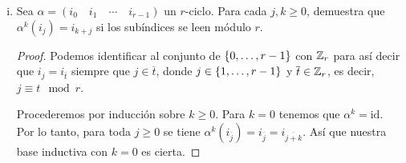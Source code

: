 \setcounter{section}{1}
\begin{enumerate}[(i)] \item
        Sea \( \alpha = \left( i_0\quad i_1\quad \cdots\quad i_{r-1} \right) \) un \( r \)-ciclo.
        Para cada \( j,k\geq 0 \), demuestra que \( \alpha^k \left( i_j \right) = i_{k+j} \) 
        si los subíndices se leen módulo \( r \).
        \begin{proof}
            Podemos identificar al conjunto de
            \( \left\{ 0,\ldots,r-1 \right\} \) con \( \mathbb{Z}_{r} \) para así decir que 
            \( i_{j}= i_{\overline{t}} \) siempre que \( j\in \overline{t} \), 
            donde \( j\in\left\{ 1,\ldots,r-1 \right\} \) y \( \overline{t}\in\mathbb{Z}_{r} \), es
            decir, \( j \equiv t \mod r  \). 

            Procederemos por inducción sobre \( k\geq 0 \). Para \( k = 0 \) 
            tenemos que \( \alpha^k = \mathrm{id} \). Por lo tanto, para toda $j\geq 0$
            se tiene \( \alpha^k \left( i_{\overline{j}} \right) = i_{\overline{j}}=
            i_{\overline{j+k}}\). Así que nuestra base inductiva con \( k=0 \) es cierta.
            

\end{proof}
\end{enumerate}
